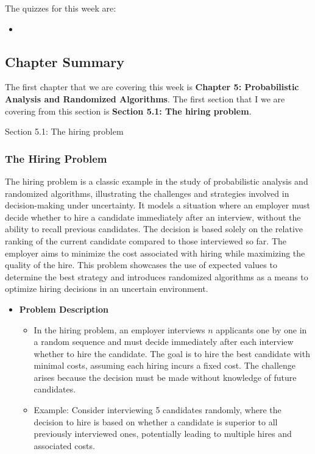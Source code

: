 The quizzes for this week are:

\begin{itemize}
    \item {}
\end{itemize}

\subsection{Chapter Summary}

The first chapter that we are covering this week is \textbf{Chapter 5: Probabilistic Analysis and Randomized Algorithms}. The first section that I we are covering from this section is \textbf{Section 5.1: The hiring problem}.

\begin{notes}{Section 5.1: The hiring problem}
    \subsubsection*{The Hiring Problem}

    The hiring problem is a classic example in the study of probabilistic analysis and randomized algorithms, illustrating the challenges and strategies involved in decision-making under uncertainty. 
    It models a situation where an employer must decide whether to hire a candidate immediately after an interview, without the ability to recall previous candidates. The decision is based solely on 
    the relative ranking of the current candidate compared to those interviewed so far. The employer aims to minimize the cost associated with hiring while maximizing the quality of the hire. This 
    problem showcases the use of expected values to determine the best strategy and introduces randomized algorithms as a means to optimize hiring decisions in an uncertain environment.
    
    \begin{itemize}
        \item \textbf{Problem Description}
        \begin{itemize}
            \item In the hiring problem, an employer interviews $n$ applicants one by one in a random sequence and must decide immediately after each interview whether to hire the candidate. The 
            goal is to hire the best candidate with minimal costs, assuming each hiring incurs a fixed cost. The challenge arises because the decision must be made without knowledge of future candidates.
            \item Example: Consider interviewing 5 candidates randomly, where the decision to hire is based on whether a candidate is superior to all previously interviewed ones, potentially 
            leading to multiple hires and associated costs.
        \end{itemize}
        

\end{itemize}
\end{notes}
